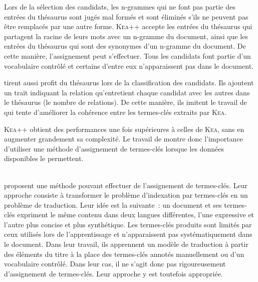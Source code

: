     Lors de la sélection des candidats, les n-grammes qui ne font pas partie des
    entrées du thésaurus sont jugés mal formés et sont éliminés s'ils ne peuvent
    pas être remplacés par une autre forme. \textsc{Kea}++ accepte les entrées
    du thésaurus qui partagent la racine de leurs mots avec un n-gramme du
    document, ainsi que les entrées du thésaurus qui sont des synonymes d'un
    n-gramme du document. De cette manière, l'assignement peut s'effectuer. Tous
    les candidats font partie d'un vocabulaire contrôlé et certains d'entre eux
    n'apparaissent pas dans le document.

     tirent aussi profit du thésaurus lors
    de la classification des candidats. Ils ajoutent un trait indiquant la
    relation qu'entretient chaque candidat avec les autres dans le thésaurus (le
    nombre de relations). De cette manière, ils imitent le travail de
     qui tente d'améliorer la cohérence entre
    les termes-clés extraits par \textsc{Kea}.

    \textsc{Kea}++ obtient des performances une fois supérieures à celles de
    \textsc{Kea}, sans en
    augmenter grandement sa complexité. Le travail de
     montre donc l'importance d'utiliser
    une méthode d'assignement de termes-clés lorsque les données disponibles le
    permettent.

    ~\\ proposent une méthode pouvant effectuer de
    l'assignement de termes-clés. Leur approche consiste à transformer le
    problème d'indexation par termes-clés en un problème de traduction. Leur
    idée est la suivante~: un document et ses termes-clés expriment le même
    contenu dans deux langues différentes, l'une expressive et l'autre plus
    concise et plus synthétique. Les termes-clés produits sont limités par ceux
    utilisés lors de l'apprentissage  et n'apparaissent pas systématiquement
    dans le document. Dans leur travail, ils apprennent un modèle de traduction
    à partir des éléments du titre à la place des termes-clés annotés
    manuellement ou d'un vocabulaire contrôlé. Dans leur cas, il ne s'agit donc
    pas rigoureusement d'assignement de termes-clés. Leur approche y est
    toutefois appropriée.



